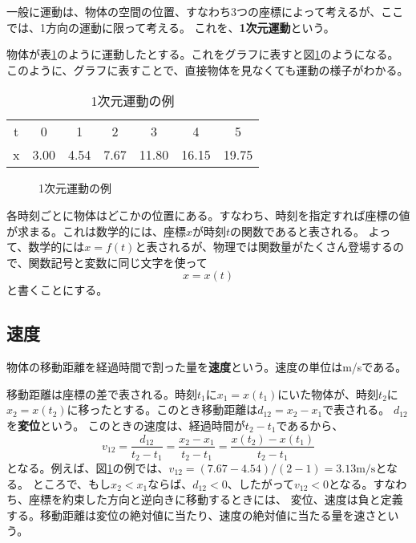 \documentclass[a4paper, uplatex]{jsarticle}
\begin{document}
一般に運動は、物体の空間の位置、すなわち3つの座標によって考えるが、ここでは、1方向の運動に限って考える。
これを、\textbf{1次元運動}という。

物体が表\ref{tab:1d-motion}のように運動したとする。これをグラフに表すと図\ref{fig:1d-motion}のようになる。
このように、グラフに表すことで、直接物体を見なくても運動の様子がわかる。

\begin{table}[htbp]
  \centering
  \caption{1次元運動の例}\label{tab:1d-motion}
  \begin{tabular}{ccccccc}
  \toprule
  t & 0    & 1    & 2    & 3     & 4     & 5     \\
  x & 3.00 & 4.54 & 7.67 & 11.80 & 16.15 & 19.75 \\ \bottomrule
  \end{tabular}
\end{table}

\begin{figure}[htbp]
\centering
{}
\caption{1次元運動の例}\label{fig:1d-motion}
\end{figure}

各時刻ごとに物体はどこかの位置にある。すなわち、時刻を指定すれば座標の値が求まる。これは数学的には、座標\(x\)が時刻\(t\)の関数であると表される。
よって、数学的には\(x=f(t)\)と表されるが、物理では関数量がたくさん登場するので、関数記号と変数に同じ文字を使って
\begin{equation}
  x = x(t)
  \label{eq:1d-function}
\end{equation}
と書くことにする。

\subsection{速度}

物体の移動距離を経過時間で割った量を\textbf{速度}という。速度の単位はm/sである。

移動距離は座標の差で表される。時刻\(t_1\)に\(x_1=x(t_1)\)にいた物体が、時刻\(t_2\)に\(x_2=x(t_2)\)に移ったとする。このとき移動距離は\(d_{12}=x_2-x_1\)で表される。
\(d_{12}\)を\textbf{変位}という。
このときの速度は、経過時間が\(t_2-t_1\)であるから、
\begin{equation}
  v_{12} = \frac{d_{12}}{t_2-t_1} = \frac{x_2-x_1}{t_2-t_1} = \frac{x(t_2)-x(t_1)}{t_2-t_1}
  \label{eq:1d-motion}
\end{equation}
となる。例えば、図\ref{fig:1d-motion}の例では、\(v_{12}=(7.67 - 4.54)/(2 - 1)=3.13\mathrm{m/s}\)となる。
ところで、もし\(x_2<x_1\)ならば、\(d_{12}<0\)、したがって\(v_{12}<0\)となる。すなわち、座標を約束した方向と逆向きに移動するときには、
変位、速度は負と定義する。移動距離は変位の絶対値に当たり、速度の絶対値に当たる量を速さという。
\end{document}
